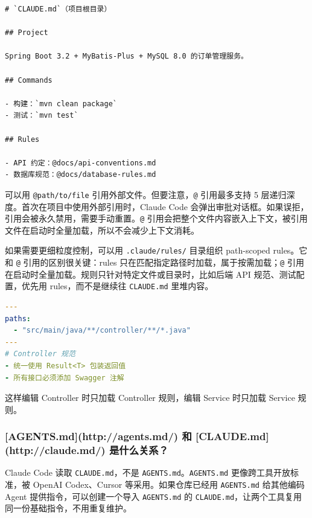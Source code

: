\documentclass[10pt,a4paper]{ctexart}
\begin{document}
\begin{lstlisting}
# `CLAUDE.md`（项目根目录）

## Project

Spring Boot 3.2 + MyBatis-Plus + MySQL 8.0 的订单管理服务。

## Commands

- 构建：`mvn clean package`
- 测试：`mvn test`

## Rules

- API 约定：@docs/api-conventions.md
- 数据库规范：@docs/database-rules.md
\end{lstlisting}



可以用 \texttt{@path/to/file} 引用外部文件。但要注意，\texttt{@} 引用最多支持 5 层递归深度。首次在项目中使用外部引用时，Claude Code 会弹出审批对话框。如果误拒，引用会被永久禁用，需要手动重置。\texttt{@} 引用会把整个文件内容嵌入上下文，被引用文件在启动时全量加载，所以不会减少上下文消耗。



如果需要更细粒度控制，可以用 \texttt{.claude/rules/} 目录组织 path-scoped rules。它和 \texttt{@} 引用的区别很关键：rules 只在匹配指定路径时加载，属于按需加载；\texttt{@} 引用在启动时全量加载。规则只针对特定文件或目录时，比如后端 API 规范、测试配置，优先用 rules，而不是继续往 \texttt{CLAUDE.md} 里堆内容。



\begin{lstlisting}[language=yaml]
---
paths:
  - "src/main/java/**/controller/**/*.java"
---
# Controller 规范
- 统一使用 Result<T> 包装返回值
- 所有接口必须添加 Swagger 注解
\end{lstlisting}



这样编辑 Controller 时只加载 Controller 规则，编辑 Service 时只加载 Service 规则。



\subsubsection{[AGENTS.md](http://agents.md/) 和 [CLAUDE.md](http://claude.md/) 是什么关系？}


Claude Code 读取 \texttt{CLAUDE.md}，不是 \texttt{AGENTS.md}。\texttt{AGENTS.md} 更像跨工具开放标准，被 OpenAI Codex、Cursor 等采用。如果仓库已经用 \texttt{AGENTS.md} 给其他编码 Agent 提供指令，可以创建一个导入 \texttt{AGENTS.md} 的 \texttt{CLAUDE.md}，让两个工具复用同一份基础指令，不用重复维护。
\end{document}
